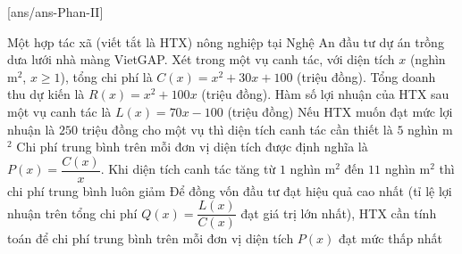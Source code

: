 \cauds
{}[ans/ans\currfilebase-Phan-II]
\begin{ex}%
	Một hợp tác xã (viết tắt là HTX) nông nghiệp tại Nghệ An đầu tư dự án trồng dưa lưới nhà màng VietGAP. Xét trong một vụ canh tác, với diện tích $x$ (nghìn m$^2$, $x \geq 1$), tổng chi phí là $C(x)=x^2+30x+100$ (triệu đồng). Tổng doanh thu dự kiến là $R(x)=x^2+100x$ (triệu đồng).
	\choiceTF
		{\True Hàm số lợi nhuận của HTX sau một vụ canh tác là $L(x)=70x-100$ (triệu đồng)}
		{\True Nếu HTX muốn đạt mức lợi nhuận là $250$ triệu đồng cho một vụ thì diện tích canh tác cần thiết là $5$ nghìn m$^2$}
		{Chi phí trung bình trên mỗi đơn vị diện tích được định nghĩa là $P(x)=\dfrac{C(x)}{x}$. Khi diện tích canh tác tăng từ $1$ nghìn m$^2$ đến $11$ nghìn m$^2$ thì chi phí trung bình luôn giảm}
		{Để đồng vốn đầu tư đạt hiệu quả cao nhất (tỉ lệ lợi nhuận trên tổng chi phí $Q(x)=\dfrac{L(x)}{C(x)}$ đạt giá trị lớn nhất), HTX cần tính toán để chi phí trung bình trên mỗi đơn vị diện tích $P(x)$ đạt mức thấp nhất}
\end{ex}
